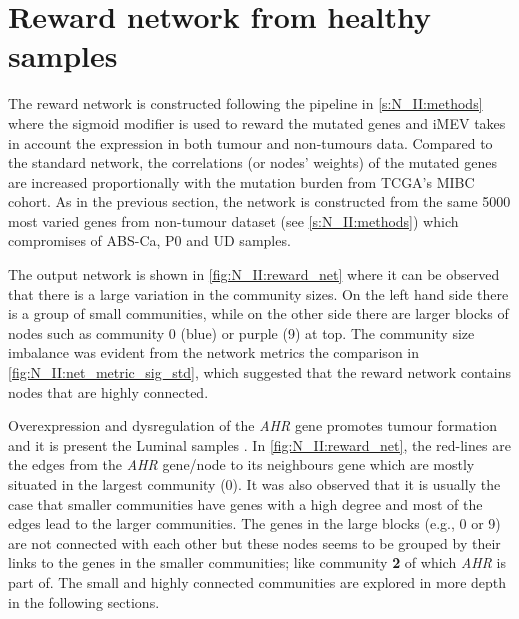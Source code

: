 \section{Reward network from healthy samples} \label{s:N_II:rwd}

\vspace{3mm}
\vspace{3mm}

The reward network is constructed following the pipeline in \cref{s:N_II:methods} where the sigmoid modifier is used to reward the mutated genes and iMEV takes in account the expression in both tumour and non-tumours data. Compared to the standard network, the correlations (or nodes' weights) of the mutated genes are increased proportionally with the mutation burden from TCGA's MIBC cohort. As in the previous section, the network is constructed from the same 5000 most varied genes from non-tumour dataset (see \cref{s:N_II:methods}) which compromises of ABS-Ca, P0 and UD samples.

The output network is shown in \cref{fig:N_II:reward_net} where it can be observed that there  is a large variation in the community sizes. On the left hand side there is a group of small communities, while on the other side there are larger blocks of nodes such as community 0 (blue) or purple (9) at top. The community size imbalance was evident from the network metrics the comparison in \cref{fig:N_II:net_metric_sig_std}, which suggested that the reward network contains nodes that are highly connected.

Overexpression and dysregulation of the \textit{AHR} gene promotes tumour formation and it is present the Luminal samples \citep{Shi2020-km}. In \cref{fig:N_II:reward_net}, the red-lines are the edges from the \textit{AHR} gene/node to its neighbours gene which are mostly situated in the largest community (0).  It was also observed that it is usually the case that smaller communities have genes with a high degree and most of the edges lead to the larger communities. The genes in the large blocks (e.g., 0 or 9) are not connected with each other but these nodes seems to be grouped by their links to the genes in the smaller communities; like community \textbf{2} of which \textit{AHR} is part of. The small and highly connected communities are explored in more depth in the following sections.

